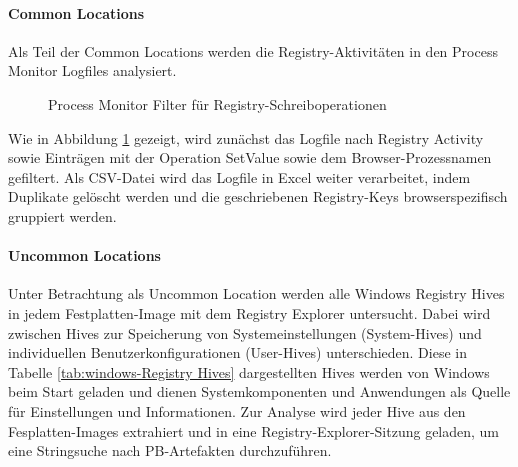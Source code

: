 \paragraph*{Common Locations}
Als Teil der Common Locations werden die Registry-Aktivitäten in den Process Monitor Logfiles analysiert.
\begin{figure}[h!]
	\centerline{}
	\caption{Process Monitor Filter für Registry-Schreiboperationen}
	\label{img:procmon-setvalue-filter}
\end{figure}
Wie in Abbildung \ref{img:procmon-setvalue-filter} gezeigt, wird zunächst das Logfile nach \glqq{}Registry Activity\grqq{} sowie Einträgen mit der Operation \glqq{}SetValue\grqq{} sowie dem Browser-Prozessnamen gefiltert.
Als CSV-Datei wird das Logfile in Excel weiter verarbeitet, indem Duplikate gelöscht werden und die geschriebenen Registry-Keys browserspezifisch gruppiert werden.
	
\paragraph*{Uncommon Locations}
Unter Betrachtung als Uncommon Location werden alle Windows Registry Hives in jedem Festplatten-Image mit dem Registry Explorer untersucht.
Dabei wird zwischen Hives zur Speicherung von Systemeinstellungen (System-Hives) und individuellen Benutzerkonfigurationen (User-Hives) unterschieden. Diese in Tabelle \ref{tab:windows-Registry Hives} dargestellten Hives werden von Windows beim Start geladen und dienen Systemkomponenten und Anwendungen als Quelle für Einstellungen und Informationen. \cite{Haircutfish.04.11.2022}
Zur Analyse wird jeder Hive aus den Fesplatten-Images extrahiert und in eine Registry-Explorer-Sitzung geladen, um eine Stringsuche nach PB-Artefakten durchzuführen.

